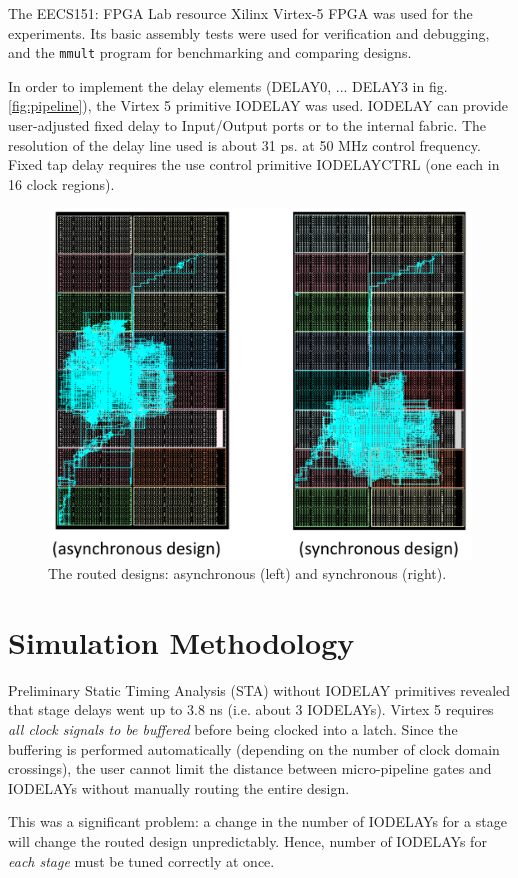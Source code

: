 \documentclass[10pt,journal,compsoc]{IEEEtran}
\begin{document}
The EECS151: FPGA Lab resource Xilinx Virtex-5 FPGA was used for the
experiments. Its basic assembly tests were used for verification and debugging, 
and the \texttt{mmult} program for benchmarking and comparing designs.

In order to implement the delay elements (DELAY0, ... DELAY3 in fig. \ref{fig:pipeline}), the
Virtex 5 primitive IODELAY was used. IODELAY can provide user-adjusted fixed
delay to Input/Output ports or to the internal fabric. The resolution of the
delay line used is about 31 ps. at 50 MHz control frequency. Fixed tap delay
requires the use control primitive IODELAYCTRL
(one each in 16 clock regions). 


\begin{figure} 
	\centering
	\includegraphics[width = 0.5 \textwidth]{layout}
	\caption{The routed designs: asynchronous (left) and synchronous (right).} 
	\label{fig:layout}
\end{figure}



\section{Simulation Methodology}

Preliminary Static Timing Analysis (STA) without IODELAY primitives revealed
that stage delays went up to 3.8 ns (i.e. about 3 IODELAYs). Virtex 5 requires
\emph{all clock signals to be buffered} before being clocked into a latch.
Since the buffering is performed automatically (depending on the number of
clock domain crossings), the user cannot limit the distance between 
micro-pipeline gates and IODELAYs without manually routing the entire design.

This was a significant problem: a change in the number of IODELAYs for
a stage will change the routed design unpredictably. Hence, number of IODELAYs
for \emph{each stage} must be tuned correctly at once.
\end{document}

